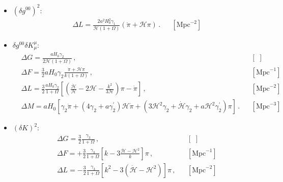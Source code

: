 \documentclass[prd,nofootinbib,showpacs]{revtex4}
\def\l{\left}
\def\r{\right}
\def\f{\frac}
\def\hub{{\mathcal H}}
\begin{document}
{\begin{itemize}
{\begin{align}
%
\Delta X=&1 \,, \hspace{1cm} \Delta \dot{X}=0  \, , & & [\,\, , \,\,] \, \nonumber \\
%
\Delta Y=&  \frac{a\Omega^\prime}{2(1+\Omega)}  \, , & & [\,\, ] \, \nonumber \\
%
\Delta U=&1, \, & & [\,\, ] \, \nonumber \\
%
\Delta V=&\f{1}{2}\f{a\Omega'}{1+\Omega} \,, \hspace{1cm} \Delta \dot{V}=\f{a\hub}{2(1+\Omega)}\l[\Omega' +a\Omega'' -\f{a\Omega'^{\,2}}{1+\Omega} \r] \, , & & [\,\, , \text{Mpc}^{-1}]\nonumber \\ \,
\Delta\mathcal{Q}=& 1\,, & & [\,\, ]
\end{align}}
%
\item[] \underline{$(\delta g^{00})^2$}:\\
{\small
\begin{align}\label{Eq:ContribGamma1}
& \Delta {{ L}}= \f{2a^2H_0^2\gamma_1}{\hub \l(1 + \Omega \r)}\l(\dot{\pi}+\hub\pi\r)\, .& & [\text{Mpc}^{-2}] \,
\end{align}}
%
\item[] 
\underline{$\delta g^{00}\delta K^\mu_\mu$}:
{\small
\begin{align} \label{Eq:ContribGamma2}
&\Delta{ G}=\f{a H_0 \gamma_2}{2\hub(1+\Omega)} \, , & & [\,\,] \,\nonumber \\
%
&\Delta{ F}=\f{3}{2}aH_0\gamma_2\f{\dot{\pi}+\hub\pi}{k(1+\Omega)}\, , & &  [\text{Mpc}^{-1}] \,\nonumber\\
%
&\Delta{ L}=\f{3}{2} \f{a H_0\gamma_2}{1+\Omega}\left[\l(\f{\dot{\hub}}{\hub}-2\hub-\f{k^2}{3\hub}\r)\pi-\dot{\pi}\r] \, ,& &  [\text{Mpc}^{-2}] \,\nonumber\\
%
&\Delta{ M}= aH_0\l[\gamma_2\ddot{\pi}+\l(4\gamma_2+a\gamma_2^\prime\r)\hub\dot{\pi}+\l(3\hub^2\gamma_2+\dot{\hub}\gamma_2+a\hub^2\gamma_2^\prime\r)\pi\r]\, . & &  [\text{Mpc}^{-3}] \,
\end{align}}
%
\item[] \underline{$(\delta K)^2$}:\\
{\small
\begin{align} \label{Eq:ContribGamma3}
%
&\Delta{ G}=\f{3}{2}\f{\gamma_3}{1+\Omega}\, , & &  [\,\,]  \,\nonumber \\
%
&\Delta{ F}=+\f{3}{2}\f{\gamma_3}{1+\Omega}\l[k-3\f{\dot{\hub}-\hub^2}{k}\r]\pi \, , & &  [\text{Mpc}^{-1}] \,\nonumber\\
%
&\Delta{ L}= -\f{3}{2}\f{\gamma_3}{1+\Omega}\l[k^2-3\l(\dot{\hub}-\hub^2\r)\r]\pi \, ,& &  [\text{Mpc}^{-2}] \,\nonumber\\

\end{align}}
\end{itemize}}
\end{document}
